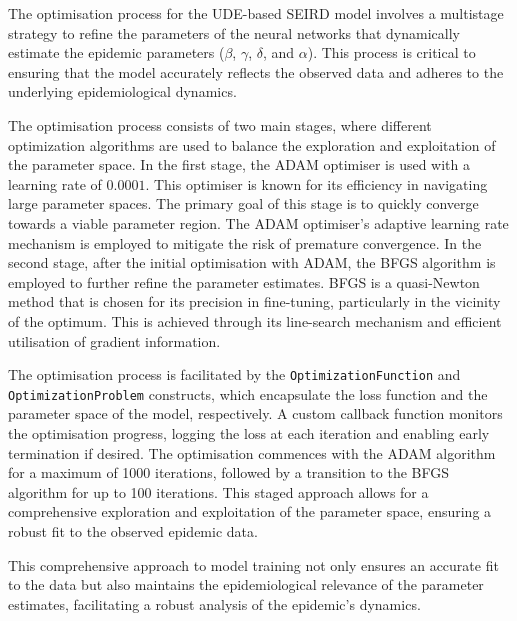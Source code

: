 \documentclass[12pt]{article}
\begin{document}
The optimisation process for the UDE-based SEIRD model involves a multistage strategy to refine the parameters of the neural networks that dynamically estimate the epidemic parameters (\(\beta\), \(\gamma\), \(\delta\), and \(\alpha\)). This process is critical to ensuring that the model accurately reflects the observed data and adheres to the underlying epidemiological dynamics.

The optimisation process consists of two main stages, where different optimization algorithms are used to balance the exploration and exploitation of the parameter space. In the first stage, the ADAM optimiser is used with a learning rate of \(0.0001\). This optimiser is known for its efficiency in navigating large parameter spaces. The primary goal of this stage is to quickly converge towards a viable parameter region. The ADAM optimiser's adaptive learning rate mechanism is employed to mitigate the risk of premature convergence. In the second stage, after the initial optimisation with ADAM, the BFGS algorithm is employed to further refine the parameter estimates. BFGS is a quasi-Newton method that is chosen for its precision in fine-tuning, particularly in the vicinity of the optimum. This is achieved through its line-search mechanism and efficient utilisation of gradient information.

The optimisation process is facilitated by the \texttt{OptimizationFunction} and \texttt{OptimizationProblem} constructs, which encapsulate the loss function and the parameter space of the model, respectively. A custom callback function monitors the optimisation progress, logging the loss at each iteration and enabling early termination if desired. The optimisation commences with the ADAM algorithm for a maximum of 1000 iterations, followed by a transition to the BFGS algorithm for up to 100 iterations. This staged approach allows for a comprehensive exploration and exploitation of the parameter space, ensuring a robust fit to the observed epidemic data.

This comprehensive approach to model training not only ensures an accurate fit to the data but also maintains the epidemiological relevance of the parameter estimates, facilitating a robust analysis of the epidemic's dynamics.
\end{document}
